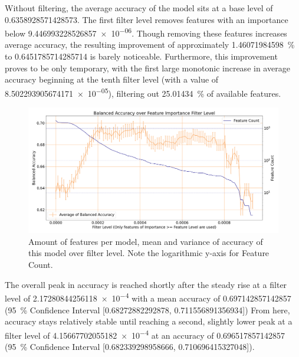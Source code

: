 
Without filtering, the average accuracy of the model sits at a base level of 
\num{0.6358928571428573}. The first filter level removes features with an importance below 
\num{9.446993228526857e-06}. Though removing these features increases average accuracy,
the resulting improvement of approximately \SI{1.46071984598}{\percent} to \num{0.6451785714285714} is 
barely noticeable. Furthermore, this improvement proves to be only temporary, 
with the first large monotonic increase in average accuracy beginning at the 
tenth filter level (with a value of \num{8.502293905674171e-05}), filtering out 
\SI{25.01434}{\percent} of available features.


\begin{figure}[H]
    \centering
    \includegraphics[width=\textwidth]{img/filter_levels_accuracy_logcount.png}
    \caption{Amount of features per model, mean and variance of accuracy of 
    this model over filter level. Note the logarithmic y-axis for Feature Count.}\label{fig:importance_filter}
\end{figure}

The overall peak in accuracy is reached shortly after the steady rise at a 
filter level of \num{2.17280844256118e-4} with a mean accuracy of 
\num{0.697142857142857} (\SI{95}{\percent} Confidence Interval [\num{0.68272882292878}, \num{0.711556891356934}])
From here, accuracy stays relatively stable until reaching a second, slightly 
lower peak at a filter level of \num{4.15667702055182e-4} at an accuracy of
\num{0.696517857142857} (\SI{95}{\percent} Confidence Interval [\num{0.682339298958666}, \num{0.710696415327048}]).

